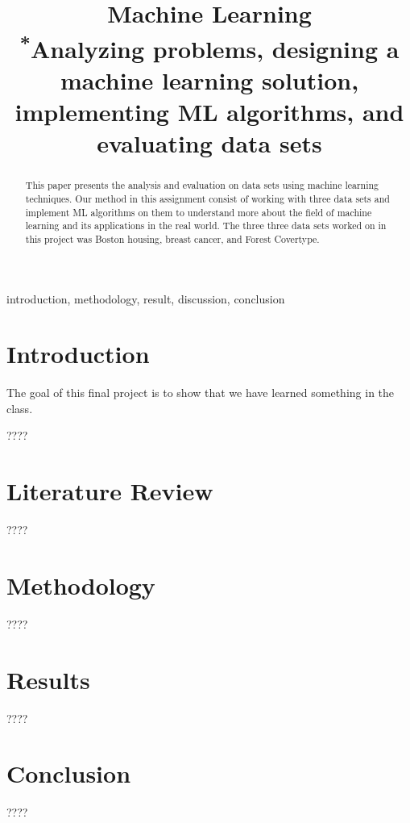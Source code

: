 \documentclass[conference]{IEEEtran}
\begin{document}
\title{Machine Learning\\
{\footnotesize \textsuperscript{*}Analyzing problems, designing a machine learning solution, implementing ML algorithms, and evaluating  data sets }
}

\author{
\and
{}
\and
{}
\and
{}
}

\maketitle


\begin{abstract}
This paper presents the analysis and evaluation on data sets using machine learning techniques. Our method in this assignment consist of working with three data sets and implement ML algorithms on them to understand more about the field of machine learning and its applications in the real world. The three three data sets worked on in this project was  Boston housing, breast cancer, and Forest Covertype.
\end{abstract}

\begin{IEEEkeywords}
introduction, methodology, result, discussion, conclusion
\end{IEEEkeywords}


\section{Introduction}
The goal of this final project is to show that we have learned something in the class.

????

\section{Literature Review}
????
\section{Methodology}
????
\section{Results}
????
\section{Conclusion}
????
\end{document}
